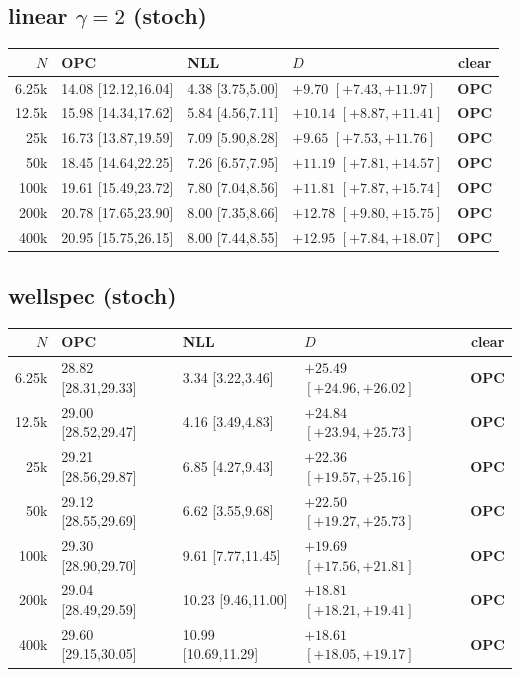 \documentclass[10pt]{article}
\begin{document}
\subsection*{linear $\gamma{=}2$ (stoch)}
{\scriptsize
\begin{tabular}{@{}r lll c@{}}
\toprule
$N$ & OPC & NLL & $D$ & clear \\
\midrule
6.25k & 14.08 [12.12,16.04] & 4.38 [3.75,5.00] & $+9.70$ $[+7.43,+11.97]$ & \textbf{OPC} \\
12.5k & 15.98 [14.34,17.62] & 5.84 [4.56,7.11] & $+10.14$ $[+8.87,+11.41]$ & \textbf{OPC} \\
25k & 16.73 [13.87,19.59] & 7.09 [5.90,8.28] & $+9.65$ $[+7.53,+11.76]$ & \textbf{OPC} \\
50k & 18.45 [14.64,22.25] & 7.26 [6.57,7.95] & $+11.19$ $[+7.81,+14.57]$ & \textbf{OPC} \\
100k & 19.61 [15.49,23.72] & 7.80 [7.04,8.56] & $+11.81$ $[+7.87,+15.74]$ & \textbf{OPC} \\
200k & 20.78 [17.65,23.90] & 8.00 [7.35,8.66] & $+12.78$ $[+9.80,+15.75]$ & \textbf{OPC} \\
400k & 20.95 [15.75,26.15] & 8.00 [7.44,8.55] & $+12.95$ $[+7.84,+18.07]$ & \textbf{OPC} \\
\bottomrule
\end{tabular}}

\subsection*{wellspec (stoch)}
{\scriptsize
\begin{tabular}{@{}r lll c@{}}
\toprule
$N$ & OPC & NLL & $D$ & clear \\
\midrule
6.25k & 28.82 [28.31,29.33] & 3.34 [3.22,3.46] & $+25.49$ $[+24.96,+26.02]$ & \textbf{OPC} \\
12.5k & 29.00 [28.52,29.47] & 4.16 [3.49,4.83] & $+24.84$ $[+23.94,+25.73]$ & \textbf{OPC} \\
25k & 29.21 [28.56,29.87] & 6.85 [4.27,9.43] & $+22.36$ $[+19.57,+25.16]$ & \textbf{OPC} \\
50k & 29.12 [28.55,29.69] & 6.62 [3.55,9.68] & $+22.50$ $[+19.27,+25.73]$ & \textbf{OPC} \\
100k & 29.30 [28.90,29.70] & 9.61 [7.77,11.45] & $+19.69$ $[+17.56,+21.81]$ & \textbf{OPC} \\
200k & 29.04 [28.49,29.59] & 10.23 [9.46,11.00] & $+18.81$ $[+18.21,+19.41]$ & \textbf{OPC} \\
400k & 29.60 [29.15,30.05] & 10.99 [10.69,11.29] & $+18.61$ $[+18.05,+19.17]$ & \textbf{OPC} \\
\bottomrule
\end{tabular}}
\end{document}
